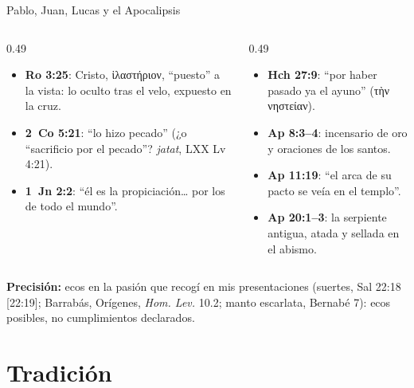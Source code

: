 \documentclass[hyperref={bookmarks=false},aspectratio=169]{beamer}
\newcommand{\grc}[1]{\foreignlanguage{ancientgreek}{#1}}
\newcommand{\precision}[1]{{\footnotesize\color{sepia}\textbf{Precisión:} #1}}
\begin{document}
\begin{frame}{Pablo, Juan, Lucas y el Apocalipsis}
\scriptsize
\begin{columns}[t,onlytextwidth]
\begin{column}{0.49\textwidth}
\begin{itemize}
\item \textbf{Ro 3:25}: Cristo, \grc{ἱλαστήριον}, ``puesto'' a la vista: lo oculto tras el velo, expuesto en la cruz.
\item \textbf{2~Co 5:21}: ``lo hizo pecado'' (¿o ``sacrificio por el pecado''? \emph{jatat}, LXX Lv 4:21).
\item \textbf{1~Jn 2:2}: ``él es la propiciación\ldots{} por los de todo el mundo''.
\end{itemize}
\end{column}
\begin{column}{0.49\textwidth}
\begin{itemize}
\item \textbf{Hch 27:9}: ``por haber pasado ya el ayuno'' (\grc{τὴν νηστείαν}).
\item \textbf{Ap 8:3--4}: incensario de oro y oraciones de los santos.
\item \textbf{Ap 11:19}: ``el arca de su pacto se veía en el templo''.
\item \textbf{Ap 20:1--3}: la serpiente antigua, atada y sellada en el abismo.
\end{itemize}
\end{column}
\end{columns}\par\medskip
\precision{ecos en la pasión que recogí en mis presentaciones (suertes, Sal 22:18 [22:19]; Barrabás, Orígenes, \emph{Hom. Lev.} 10.2; manto escarlata, Bernabé 7): ecos posibles, no cumplimientos declarados.}
\end{frame}

\section{Tradición}
\end{document}
